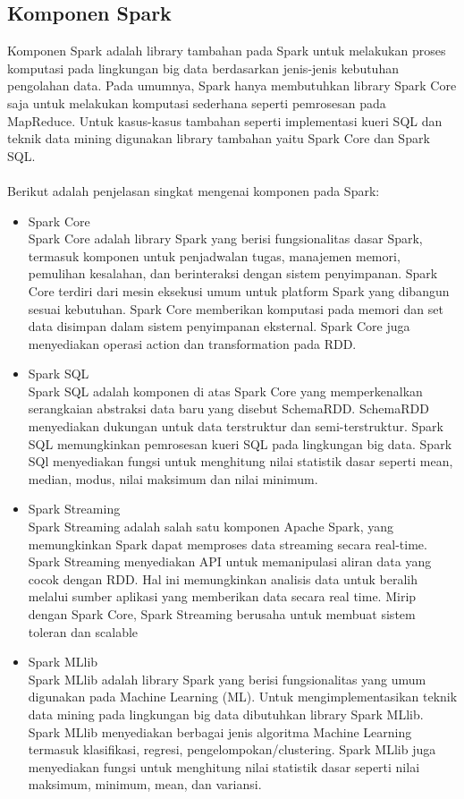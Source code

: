 \subsection{Komponen Spark}
Komponen Spark adalah library tambahan pada Spark untuk melakukan proses komputasi pada lingkungan big data berdasarkan jenis-jenis kebutuhan pengolahan data. Pada umumnya, Spark hanya membutuhkan library Spark Core saja untuk melakukan komputasi sederhana seperti pemrosesan pada MapReduce. Untuk kasus-kasus tambahan seperti implementasi kueri SQL dan teknik data mining digunakan library tambahan yaitu Spark Core dan Spark SQL. 
\\\\
Berikut adalah penjelasan singkat mengenai komponen pada Spark:

\begin{itemize}
\item Spark Core \\
Spark Core adalah library Spark yang berisi fungsionalitas dasar Spark, termasuk komponen untuk penjadwalan tugas, manajemen memori, pemulihan kesalahan, dan berinteraksi dengan sistem penyimpanan. Spark Core terdiri dari mesin eksekusi umum untuk platform Spark yang dibangun sesuai kebutuhan. Spark Core memberikan komputasi pada memori dan set data disimpan dalam sistem penyimpanan eksternal. Spark Core juga  menyediakan operasi action dan transformation pada RDD.

\item Spark SQL  \\
Spark SQL adalah komponen di atas Spark Core yang memperkenalkan serangkaian abstraksi data baru yang disebut SchemaRDD. SchemaRDD menyediakan dukungan untuk data terstruktur dan semi-terstruktur. Spark SQL memungkinkan pemrosesan kueri SQL pada lingkungan big data. Spark SQl menyediakan fungsi untuk menghitung nilai statistik dasar seperti mean, median, modus, nilai maksimum dan nilai minimum.

\item Spark Streaming \\
Spark Streaming adalah salah satu komponen Apache Spark, yang memungkinkan Spark dapat memproses data streaming secara real-time. Spark Streaming menyediakan API untuk memanipulasi aliran data yang cocok dengan RDD. Hal ini memungkinkan analisis data untuk beralih melalui sumber aplikasi yang memberikan data secara real time. Mirip dengan Spark Core, Spark Streaming berusaha untuk membuat sistem toleran dan scalable

\item
Spark MLlib \\
Spark MLlib adalah library Spark yang berisi fungsionalitas yang umum digunakan pada Machine Learning (ML). Untuk mengimplementasikan teknik data mining pada lingkungan big data dibutuhkan library Spark MLlib.  Spark MLlib menyediakan berbagai jenis algoritma Machine Learning termasuk klasifikasi, regresi, pengelompokan/clustering. Spark MLlib juga menyediakan fungsi untuk menghitung nilai statistik dasar seperti nilai maksimum, minimum, mean, dan variansi.

\end{itemize}

